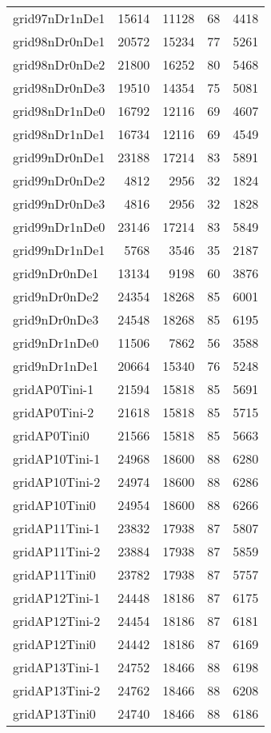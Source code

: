 \begin{tabular}{lrrrr}
grid97nDr1nDe1 & 15614 & 11128 & 68 & 4418 \\
grid98nDr0nDe1 & 20572 & 15234 & 77 & 5261 \\
grid98nDr0nDe2 & 21800 & 16252 & 80 & 5468 \\
grid98nDr0nDe3 & 19510 & 14354 & 75 & 5081 \\
grid98nDr1nDe0 & 16792 & 12116 & 69 & 4607 \\
grid98nDr1nDe1 & 16734 & 12116 & 69 & 4549 \\
grid99nDr0nDe1 & 23188 & 17214 & 83 & 5891 \\
grid99nDr0nDe2 & 4812 & 2956 & 32 & 1824 \\
grid99nDr0nDe3 & 4816 & 2956 & 32 & 1828 \\
grid99nDr1nDe0 & 23146 & 17214 & 83 & 5849 \\
grid99nDr1nDe1 & 5768 & 3546 & 35 & 2187 \\
grid9nDr0nDe1 & 13134 & 9198 & 60 & 3876 \\
grid9nDr0nDe2 & 24354 & 18268 & 85 & 6001 \\
grid9nDr0nDe3 & 24548 & 18268 & 85 & 6195 \\
grid9nDr1nDe0 & 11506 & 7862 & 56 & 3588 \\
grid9nDr1nDe1 & 20664 & 15340 & 76 & 5248 \\
gridAP0Tini-1 & 21594 & 15818 & 85 & 5691 \\
gridAP0Tini-2 & 21618 & 15818 & 85 & 5715 \\
gridAP0Tini0 & 21566 & 15818 & 85 & 5663 \\
gridAP10Tini-1 & 24968 & 18600 & 88 & 6280 \\
gridAP10Tini-2 & 24974 & 18600 & 88 & 6286 \\
gridAP10Tini0 & 24954 & 18600 & 88 & 6266 \\
gridAP11Tini-1 & 23832 & 17938 & 87 & 5807 \\
gridAP11Tini-2 & 23884 & 17938 & 87 & 5859 \\
gridAP11Tini0 & 23782 & 17938 & 87 & 5757 \\
gridAP12Tini-1 & 24448 & 18186 & 87 & 6175 \\
gridAP12Tini-2 & 24454 & 18186 & 87 & 6181 \\
gridAP12Tini0 & 24442 & 18186 & 87 & 6169 \\
gridAP13Tini-1 & 24752 & 18466 & 88 & 6198 \\
gridAP13Tini-2 & 24762 & 18466 & 88 & 6208 \\
gridAP13Tini0 & 24740 & 18466 & 88 & 6186 \\

\end{tabular}
